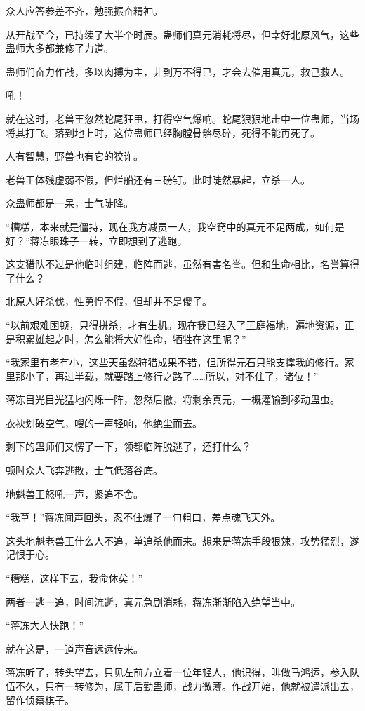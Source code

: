 \begin{this_body}
众人应答参差不齐，勉强振奋精神。

从开战至今，已持续了大半个时辰。蛊师们真元消耗将尽，但幸好北原风气，这些蛊师大多都兼修了力道。

蛊师们奋力作战，多以肉搏为主，非到万不得已，才会去催用真元，救己救人。

吼！

就在这时，老兽王忽然蛇尾狂甩，打得空气爆响。蛇尾狠狠地击中一位蛊师，当场将其打飞。落到地上时，这位蛊师已经胸膛骨骼尽碎，死得不能再死了。

人有智慧，野兽也有它的狡诈。

老兽王体残虚弱不假，但烂船还有三磅钉。此时陡然暴起，立杀一人。

众蛊师都是一呆，士气陡降。

“糟糕，本来就是僵持，现在我方减员一人，我空窍中的真元不足两成，如何是好？”蒋冻眼珠子一转，立即想到了逃跑。

这支猎队不过是他临时组建，临阵而逃，虽然有害名誉。但和生命相比，名誉算得了什么？

北原人好杀伐，性勇悍不假，但却并不是傻子。

“以前艰难困顿，只得拼杀，才有生机。现在我已经入了王庭福地，遍地资源，正是积累雄起之时，怎么能将大好性命，牺牲在这里呢？”

“我家里有老有小，这些天虽然狩猎成果不错，但所得元石只能支撑我的修行。家里那小子，再过半载，就要踏上修行之路了……所以，对不住了，诸位！”

蒋冻目光目光猛地闪烁一阵，忽然后撤，将剩余真元，一概灌输到移动蛊虫。

衣袂划破空气，嗖的一声轻响，他绝尘而去。

剩下的蛊师们又愣了一下，领都临阵脱逃了，还打什么？

顿时众人飞奔逃散，士气低落谷底。

地魁兽王怒吼一声，紧追不舍。

“我草！”蒋冻闻声回头，忍不住爆了一句粗口，差点魂飞天外。

这头地魁老兽王什么人不追，单追杀他而来。想来是蒋冻手段狠辣，攻势猛烈，遂记恨于心。

“糟糕，这样下去，我命休矣！”

两者一逃一追，时间流逝，真元急剧消耗，蒋冻渐渐陷入绝望当中。

“蒋冻大人快跑！”

就在这是，一道声音远远传来。

蒋冻听了，转头望去，只见左前方立着一位年轻人，他识得，叫做马鸿运，参入队伍不久，只有一转修为，属于后勤蛊师，战力微薄。作战开始，他就被遣派出去，留作侦察棋子。


\end{this_body}
